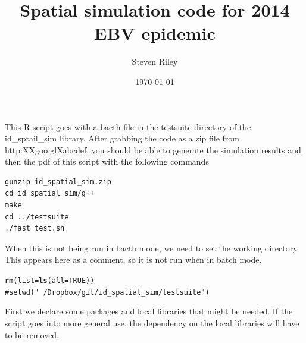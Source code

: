\documentclass{article}\usepackage{graphicx, color}
\title{Spatial simulation code for 2014 EBV epidemic}
\author{Steven Riley}
\date{\today}
\makeatletter
\newcommand{\hlfunctioncall}[1]{\textcolor[rgb]{0.501960784313725,0,0.329411764705882}{\textbf{#1}}}%
\newcommand{\hlcomment}[1]{\textcolor[rgb]{0.180392156862745,0.6,0.341176470588235}{#1}}%
\newenvironment{kframe}{%
 \def\at@end@of@kframe{}%
 \ifinner\ifhmode%
  \def\at@end@of@kframe{\end{minipage}}%
  \begin{minipage}{\columnwidth}%
 \fi\fi%
 \def\FrameCommand##1{\hskip\@totalleftmargin \hskip-\fboxsep
 \colorbox{shadecolor}{##1}\hskip-\fboxsep
     \hskip-\linewidth \hskip-\@totalleftmargin \hskip\columnwidth}%
 \MakeFramed {\advance\hsize-\width
   \@totalleftmargin\z@ \linewidth\hsize
   \@setminipage}}%
 {\par\unskip\endMakeFramed%
 \at@end@of@kframe}
\newenvironment{knitrout}{}{} %
\makeatother
\begin{document}




\maketitle




\newpage


This R script goes with a bacth file in the testsuite directory of the
id\_sptail\_sim library. After grabbing the code as a zip file from
http:XXgoo.glXabcdef, you should be able to generate the simulation
results and then the pdf of this script with the following commands

\begin{verbatim}
gunzip id_spatial_sim.zip 
cd id_spatial_sim/g++ 
make 
cd ../testsuite 
./fast_test.sh 
\end{verbatim}


When this is not being run in bacth mode, we need to set the working directory.
This appears here as a comment, so it is not run when in batch mode.

\begin{knitrout}
\color{fgcolor}\begin{kframe}
\begin{alltt}
\hlfunctioncall{rm}(list=\hlfunctioncall{ls}(all=TRUE))
\hlcomment{# setwd("~/Dropbox/git/id_spatial_sim/testsuite")}
\end{alltt}
\end{kframe}
\end{knitrout}


First we declare some packages and local libraries that might be needed. If the
script goes into more general use, the dependency on the local libraries will
have to be removed.
\end{document}
